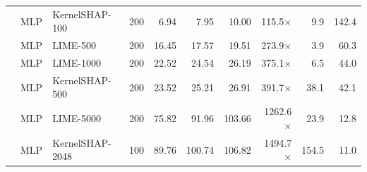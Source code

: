 \begin{longtable}{lllrrrrrrr}
 & MLP & KernelSHAP-100 & 200 & 6.94 & 7.95 & 10.00 & 115.5$\times$ & 9.9 & 142.4 \\
 & MLP & LIME-500 & 200 & 16.45 & 17.57 & 19.51 & 273.9$\times$ & 3.9 & 60.3 \\
 & MLP & LIME-1000 & 200 & 22.52 & 24.54 & 26.19 & 375.1$\times$ & 6.5 & 44.0 \\
 & MLP & KernelSHAP-500 & 200 & 23.52 & 25.21 & 26.91 & 391.7$\times$ & 38.1 & 42.1 \\
 & MLP & LIME-5000 & 200 & 75.82 & 91.96 & 103.66 & 1262.6$\times$ & 23.9 & 12.8 \\
 & MLP & KernelSHAP-2048 & 100 & 89.76 & 100.74 & 106.82 & 1494.7$\times$ & 154.5 & 11.0 \\
\end{longtable}
\endgroup
